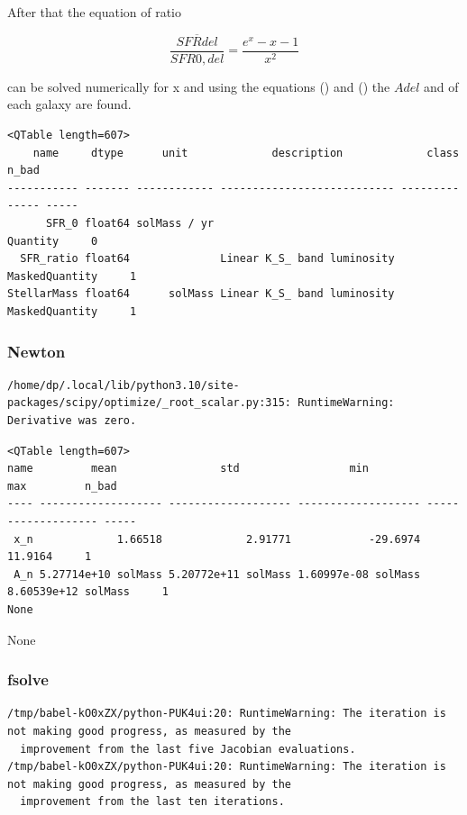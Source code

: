 \documentclass[a4paper]{article}
\begin{document}
After that the equation of ratio

\begin{equation} \label{eq:ratio}                                        \frac{\overline{SFRdel}}{SFR0,del}=\frac{e^x-x-1}{x^2}
\end{equation}

can be solved numerically for x and using the equations () and () the \(Adel\) and of each galaxy are found.

\begin{verbatim}
<QTable length=607>
    name     dtype      unit             description             class      n_bad
----------- ------- ------------ --------------------------- -------------- -----
      SFR_0 float64 solMass / yr                                   Quantity     0
  SFR_ratio float64              Linear K_S_ band luminosity MaskedQuantity     1
StellarMass float64      solMass Linear K_S_ band luminosity MaskedQuantity     1
\end{verbatim}

\subsubsection{Newton}
\label{sec:org30977fb}

\begin{verbatim}
/home/dp/.local/lib/python3.10/site-packages/scipy/optimize/_root_scalar.py:315: RuntimeWarning: Derivative was zero.
\end{verbatim}


\begin{verbatim}
<QTable length=607>
name         mean                std                 min                 max         n_bad
---- ------------------- ------------------- ------------------- ------------------- -----
 x_n             1.66518             2.91771            -29.6974             11.9164     1
 A_n 5.27714e+10 solMass 5.20772e+11 solMass 1.60997e-08 solMass 8.60539e+12 solMass     1
None
\end{verbatim}


None

\subsubsection{fsolve}
\label{sec:org9cc68bf}

\begin{verbatim}
/tmp/babel-kO0xZX/python-PUK4ui:20: RuntimeWarning: The iteration is not making good progress, as measured by the 
  improvement from the last five Jacobian evaluations.
/tmp/babel-kO0xZX/python-PUK4ui:20: RuntimeWarning: The iteration is not making good progress, as measured by the 
  improvement from the last ten iterations.
\end{verbatim}
\end{document}
